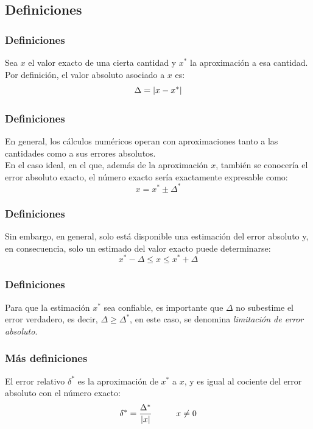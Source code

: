 \documentclass[12pt]{beamer}
\begin{document}
\subsection{Definiciones}

\begin{frame}[fragile]
\frametitle{Definiciones}
Sea $x$ el valor exacto de una cierta cantidad y $x^{*}$ la aproximación a esa cantidad.
\\
\bigskip
\pause
Por definición, el valor absoluto asociado a $x$ es:
\pause
\begin{equation}
\Delta = \abs{ x - x^{*} } 
\label{eq:ecuacion_01_03}	
\end{equation}
\end{frame}
\begin{frame}
\frametitle{Definiciones}
En general, los cálculos numéricos operan con aproximaciones tanto a las cantidades como a sus errores absolutos.
\\
\bigskip
\pause
En el caso ideal, en el que, además de la aproximación $x$, también se conocería el error absoluto exacto, el número exacto sería exactamente expresable como:
\pause
\begin{equation}
x = x^{*} \pm \Delta^{*}
\label{eq:ecuacion_01_04}    	
\end{equation}    
\end{frame}
\begin{frame}
\frametitle{Definiciones}
Sin embargo, en general, solo está disponible una estimación del error absoluto y, en consecuencia, solo un estimado del valor exacto puede determinarse:
\pause
\begin{equation}
x^{*} - \Delta \leq x \leq x^{*} + \Delta
\label{eq:ecuacion_01_05}
\end{equation}
\end{frame}
\begin{frame}
\frametitle{Definiciones}
Para que la estimación $x^{*}$ sea confiable, es importante que $\Delta$ no subestime el error verdadero, es decir, $\Delta \geq \Delta^{*}$, en este caso, se denomina \emph{limitación de error absoluto}.
\end{frame}
\begin{frame}
\frametitle{Más definiciones}
El error relativo $\delta^{*}$ es la aproximación de $x^{*}$ a $x$, y es igual al cociente del error absoluto con el número exacto:
\pause
\begin{equation}
\delta^{*} = \dfrac{\Delta^{*}}{\abs{x}} \hspace{1cm} x \neq 0
\label{eq:ecuacion_01_06}
\end{equation}
\end{frame}
\end{document}
